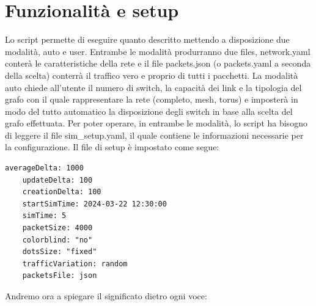 \documentclass[binding=0.6cm]{sapthesis}
\begin{document}
\section{Funzionalità e setup} 
Lo script permette di eseguire quanto descritto mettendo a
 disposizione due modalità, auto e user. Entrambe le modalità produrranno due files, 
 network.yaml conterà le caratteristiche della rete e il file packets.json (o packets.yaml
 a seconda della scelta) conterrà il traffico vero e proprio di tutti i pacchetti. La modalità auto chiede all'utente il numero di switch, la capacità dei
  link e la tipologia del grafo con il quale rappresentare la rete (completo, mesh, torus) e
   imposterà in modo del tutto automatico
   la disposizione degli switch in base alla scelta del grafo effettuata. Per poter operare,
    in entrambe le modalità, lo script ha bisogno di leggere il file sim\_setup.yaml, il quale contiene le informazioni necessarie per la configurazione. 
    Il file di setup è impostato come segue:
{\scriptsize %
\begin{lstlisting}[caption={Esempio di setup file}, label={codice:sim_setup_example}]
    averageDelta: 1000
    updateDelta: 100
    creationDelta: 100
    startSimTime: 2024-03-22 12:30:00
    simTime: 5
    packetSize: 4000
    colorblind: "no"
    dotsSize: "fixed"
    trafficVariation: random
    packetsFile: json
\end{lstlisting}
}
Andremo ora a spiegare il significato dietro ogni voce:
\end{document}
